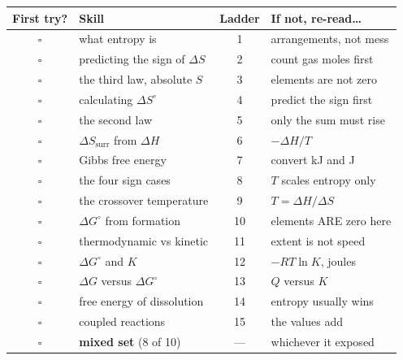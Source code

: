 \documentclass{apchem-worksheet}
\begin{document}
\renewcommand{\arraystretch}{1.25}
\noindent\begin{tabular}{@{}c p{5.7cm} c p{4.9cm}@{}}
\toprule
\textbf{First try?} & \textbf{Skill} & \textbf{Ladder} &
  \textbf{If not, re-read\ldots}\\
\midrule
$\square$ & what entropy is & 1 & arrangements, not mess \\
$\square$ & predicting the sign of $\Delta S$ & 2 & count gas moles first \\
$\square$ & the third law, absolute $S$ & 3 & elements are not zero \\
$\square$ & calculating $\Delta S^{\circ}$ & 4 & predict the sign first \\
$\square$ & the second law & 5 & only the sum must rise \\
$\square$ & $\Delta S_{\text{surr}}$ from $\Delta H$ & 6 & $-\Delta H/T$ \\
$\square$ & Gibbs free energy & 7 & convert kJ and J \\
$\square$ & the four sign cases & 8 & $T$ scales entropy only \\
$\square$ & the crossover temperature & 9 & $T = \Delta H/\Delta S$ \\
$\square$ & $\Delta G^{\circ}$ from formation & 10 & elements ARE zero here \\
$\square$ & thermodynamic vs kinetic & 11 & extent is not speed \\
$\square$ & $\Delta G^{\circ}$ and $K$ & 12 & $-RT\ln K$, joules \\
$\square$ & $\Delta G$ versus $\Delta G^{\circ}$ & 13 & $Q$ versus $K$ \\
$\square$ & free energy of dissolution & 14 & entropy usually wins \\
$\square$ & coupled reactions & 15 & the values add \\
\midrule
$\square$ & \textbf{mixed set} (8 of 10) & --- & whichever it exposed \\
\bottomrule
\end{tabular}
\end{document}
